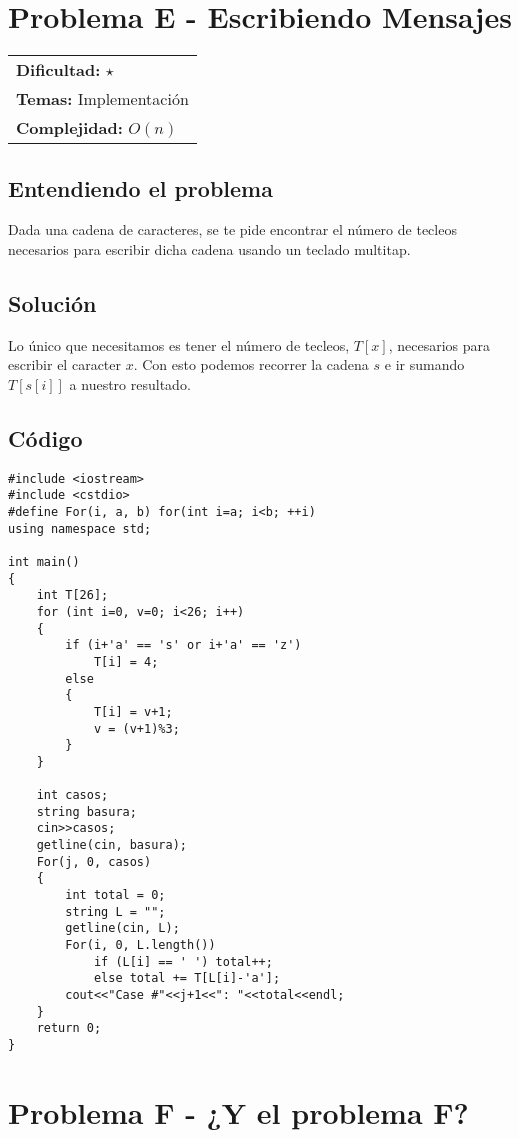 \section{Problema E - Escribiendo Mensajes}

\hfill
\begin{tabular}{@{}l@{}}
\textbf{Dificultad:} $\star$\\
\textbf{Temas:} Implementación\\
\textbf{Complejidad:} $O(n)$
\end{tabular}

\subsection*{Entendiendo el problema}
Dada una cadena de caracteres, se te pide encontrar el número de tecleos necesarios para escribir dicha cadena usando un teclado multitap.

\subsection*{Solución}
Lo único que necesitamos es tener el número de tecleos, $T[x]$, necesarios para escribir el caracter $x$. Con esto podemos recorrer la cadena $s$ e ir sumando $T[s[i]]$ a nuestro resultado.
\subsection*{Código}
\begin{verbatim}
#include <iostream>
#include <cstdio>
#define For(i, a, b) for(int i=a; i<b; ++i)
using namespace std;
 
int main()
{
    int T[26];
    for (int i=0, v=0; i<26; i++)
    {
        if (i+'a' == 's' or i+'a' == 'z')
            T[i] = 4;
        else
        {
            T[i] = v+1;
            v = (v+1)%3;
        }
    }
     
    int casos;
    string basura;
    cin>>casos;
    getline(cin, basura);
    For(j, 0, casos)
    {
        int total = 0;
        string L = "";
        getline(cin, L);
        For(i, 0, L.length())
            if (L[i] == ' ') total++;
            else total += T[L[i]-'a'];
        cout<<"Case #"<<j+1<<": "<<total<<endl;
    }
    return 0;
}
\end{verbatim}

\section{Problema F - ¿Y el problema F?}

